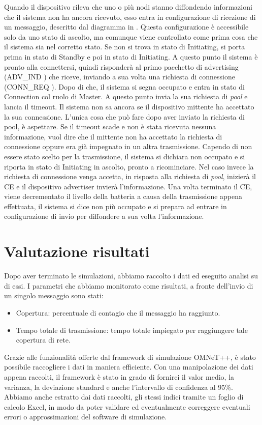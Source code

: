 Quando il dispositivo rileva che uno o più nodi stanno diffondendo informazioni che il sistema non ha ancora ricevuto, esso entra in configurazione di ricezione di un messaggio, descritto dal diagramma in . Questa configurazione è accessibile solo da uno stato di ascolto, ma comunque viene controllato come prima cosa che il sistema sia nel corretto stato. Se non si trova in stato di Initiating, si porta prima in stato di Standby e poi in stato di Initiating. A questo punto il sistema è pronto alla connettersi, quindi risponderà al primo pacchetto di advertising (ADV\_IND \cite{BT-CoreSpec4.0}) che riceve, inviando a sua volta una richiesta di connessione (CONN\_REQ \cite{BT-CoreSpec4.0}). Dopo di che, il sistema si segna occupato e entra in stato di Connection col ruolo di Master. A questo punto invia la sua richiesta di \textit{pool} e lancia il timeout. Il sistema non sa ancora se il dispositivo mittente ha accettato la sua connessione. L'unica cosa che può fare dopo aver inviato la richiesta di pool, è aspettare. Se il timeout scade e non è stata ricevuta nessuna informazione, vuol dire che il mittente non ha accettato la richiesta di connessione oppure era già impegnato in un altra trasmissione. Capendo di non essere stato scelto per la trasmissione, il sistema si dichiara non occupato e si riporta in stato di Initiating in ascolto, pronto a ricominciare. Nel caso invece la richiesta di connessione venga accetta, in risposta alla richiesta di \textit{pool}, inizierà il \acs{CE} e il dispositivo advertiser invierà l'informazione. Una volta terminato il \acs{CE}, viene decrementato il livello della batteria a causa della trasmissione appena effettuata, il sistema si dice non più occupato e si prepara ad entrare in configurazione di invio per diffondere a sua volta l'informazione.
\bigskip

\section{Valutazione risultati}
Dopo aver terminato le simulazioni, abbiamo raccolto i dati ed eseguito analisi su di essi. I parametri che abbiamo monitorato come risultati, a fronte dell'invio di un singolo messaggio sono stati:
\begin{itemize}
	\item Copertura: percentuale di contagio che il messaggio ha raggiunto.
	\item Tempo totale di trasmissione: tempo totale impiegato per raggiungere tale copertura di rete.
\end{itemize}
Grazie alle funzionalità offerte dal framework di simulazione OMNeT++, è stato possibile raccogliere i dati in maniera efficiente. Con una manipolazione dei dati appena raccolti, il framework è stato in grado di fornirci il valor medio, la varianza, la deviazione standard e anche l'intervallo di confidenza al 95\%. Abbiamo anche estratto dai dati raccolti, gli stessi indici tramite un foglio di calcolo Excel, in modo da poter validare ed eventualmente correggere eventuali errori o approssimazioni del software di simulazione.

